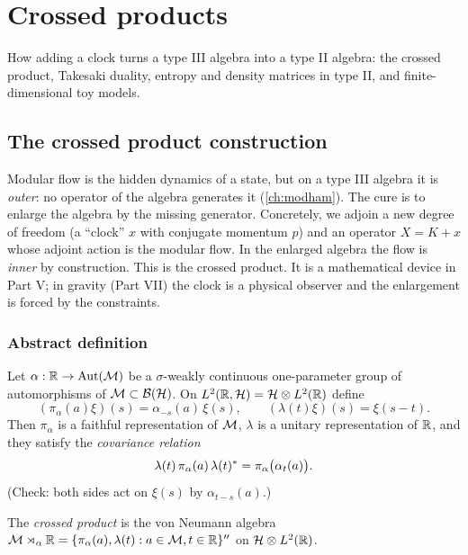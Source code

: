 \chapter{Crossed products}\label{ch:crossed_products}

How adding a clock turns a type III algebra into a type II algebra: the crossed product, Takesaki duality, entropy and density matrices in type II, and finite-dimensional toy models.

\section{The crossed product construction}\label{ch:crossed}

\begin{physmotiv}
Modular flow is the hidden dynamics of a state, but on a type III algebra it is \emph{outer}: no operator of the algebra generates it (\cref{ch:modham}). The cure is to enlarge the algebra by the missing generator. Concretely, we adjoin a new degree of freedom (a ``clock'' $x$ with conjugate momentum $p$) and an operator $X=K+x$ whose adjoint action is the modular flow. In the enlarged algebra the flow is \emph{inner} by construction. This is the crossed product. It is a mathematical device in Part V; in gravity (Part VII) the clock is a physical observer and the enlargement is forced by the constraints.
\end{physmotiv}

\subsection{Abstract definition}

Let $\alpha:\mathbb{R}\to\operatorname{Aut}(\mathcal{M})$ be a $\sigma$-weakly continuous one-parameter group of automorphisms of $\mathcal{M}\subset\mathcal{B}(\mathcal{H})$. On $L^2(\mathbb{R},\mathcal{H})=\mathcal{H}\otimes L^2(\mathbb{R})$ define
\begin{equation}
(\pi_\alpha(a)\xi)(s)=\alpha_{-s}(a)\,\xi(s),\qquad(\lambda(t)\xi)(s)=\xi(s-t).
\end{equation}
Then $\pi_\alpha$ is a faithful representation of $\mathcal{M}$, $\lambda$ is a unitary representation of $\mathbb{R}$, and they satisfy the \emph{covariance relation}
\begin{equation}
\lambda(t)\,\pi_\alpha(a)\,\lambda(t)^{*}=\pi_\alpha\big(\alpha_t(a)\big).
\end{equation}
(Check: both sides act on $\xi(s)$ by $\alpha_{t-s}(a)$.)

\begin{definition}
The \emph{crossed product} is the von Neumann algebra $\mathcal{M}\rtimes_\alpha\mathbb{R}=\{\pi_\alpha(a),\lambda(t):a\in\mathcal{M},t\in\mathbb{R}\}''$ on $\mathcal{H}\otimes L^2(\mathbb{R})$.
\end{definition}

